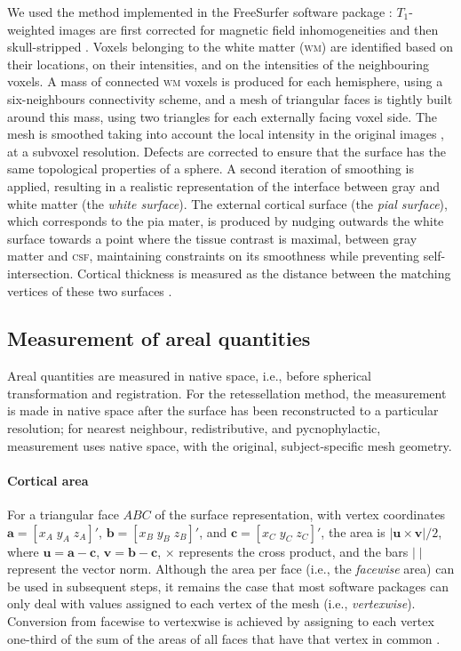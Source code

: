 We used the method implemented in the FreeSurfer software package \cite[version 5.3.0;][]{Dale1999,Fischl1999_cortical}: $T_1$-weighted images are first corrected for magnetic field inhomogeneities and then skull-stripped \citep{Segonne2004}. Voxels belonging to the white matter (\textsc{wm}) are identified based on their locations, on their intensities, and on the intensities of the neighbouring voxels. A mass of connected \textsc{wm} voxels is produced for each hemisphere, using a six-neighbours connectivity scheme, and a mesh of triangular faces is tightly built around this mass, using two triangles for each externally facing voxel side. The mesh is smoothed taking into account the local intensity in the original images \citep{Dale1993}, at a subvoxel resolution. Defects are corrected \citep{Fischl2001,Segonne2007} to ensure that the surface has the same topological properties of a sphere. A second iteration of smoothing is applied, resulting in a realistic representation of the interface between gray and white matter (the \emph{white surface}). The external cortical surface (the \emph{pial surface}), which corresponds to the pia mater, is produced by nudging outwards the white surface towards a point where the tissue contrast is maximal, between gray matter and \textsc{csf}, maintaining constraints on its smoothness while preventing self-intersection. Cortical thickness is measured as the distance between the matching vertices of these two surfaces \citep{Fischl2000}.

\subsection{Measurement of areal quantities}

Areal quantities are measured in native space, i.e., before spherical transformation and registration. For the retessellation method, the measurement is made in native space after the surface has been reconstructed to a particular resolution; for nearest neighbour, redistributive, and pycnophylactic, measurement uses native space, with the original, subject-specific mesh geometry. 

\paragraph{Cortical area}

For a triangular face $ABC$ of the surface representation, with vertex coordinates $\mathbf{a}=[x_A \; y_A \; z_A]'$, $\mathbf{b}=[x_B \; y_B \; z_B]'$, and $\mathbf{c}=[x_C \; y_C \; z_C]'$, the area is $|\mathbf{u} \times \mathbf{v}|/2$, where $\mathbf{u} = \mathbf{a}-\mathbf{c}$, $\mathbf{v} = \mathbf{b}-\mathbf{c}$, $\times$ represents the cross product, and the bars $|\;|$ represent the vector norm. Although the area per face (i.e., the \emph{facewise} area) can be used in subsequent steps, it remains the case that most software packages can only deal with values assigned to each vertex of the mesh (i.e., \emph{vertexwise}). Conversion from facewise to vertexwise is achieved by assigning to each vertex one-third of the sum of the areas of all faces that have that vertex in common \citep{Winkler2012}.

